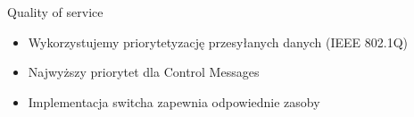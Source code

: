 \documentclass[compress,red]{beamer}
\begin{document}
\begin{frame}{Quality of service}


  \begin{itemize}
    \item Wykorzystujemy priorytetyzację przesyłanych danych (IEEE 802.1Q)
    \item Najwyższy priorytet dla Control Messages
    \item Implementacja switcha zapewnia odpowiednie zasoby
  \end{itemize}

\end{frame}
\end{document}

